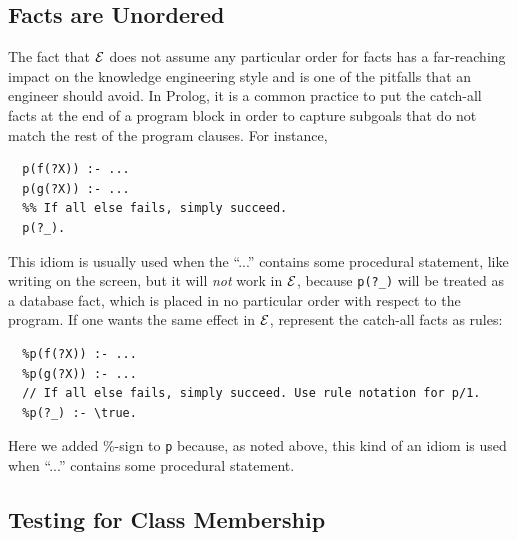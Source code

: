 \documentclass[11pt]{article}
\newcommand{\ERGO}{\mbox{\ensuremath{\cal{E}}\smaller{{\sc{RGO}}}}\xspace}
\newcommand{\FLSYSTEM}{\ERGO}
\begin{document}
\subsection{Facts are Unordered}

The fact that \FLSYSTEM does not assume any particular order for facts has a
far-reaching impact on the knowledge engineering style and is one of the
pitfalls that an engineer should avoid.  In Prolog, it is a
common practice to put the catch-all facts at the end of a program block in
order to capture subgoals that do not match the rest of the program
clauses. For instance,
\begin{verbatim}
  p(f(?X)) :- ...
  p(g(?X)) :- ...
  %% If all else fails, simply succeed.
  p(?_).
\end{verbatim}
This idiom is usually used when the ``...'' contains some procedural
statement, like writing on the screen, but it
will \emph{not} work in \FLSYSTEM, because {\tt p(?\_)} will be treated as a
database fact, which is placed in no particular order with respect to the
program. If one wants the same effect in \FLSYSTEM, represent the catch-all
facts as rules: 
\begin{verbatim}
  %p(f(?X)) :- ...
  %p(g(?X)) :- ...
  // If all else fails, simply succeed. Use rule notation for p/1.
  %p(?_) :- \true.
\end{verbatim}
Here we added \%-sign to \texttt{p} because, as noted above, this kind of
an idiom is used when ``...'' contains some procedural statement. 

\subsection{Testing for Class Membership}
\end{document}
